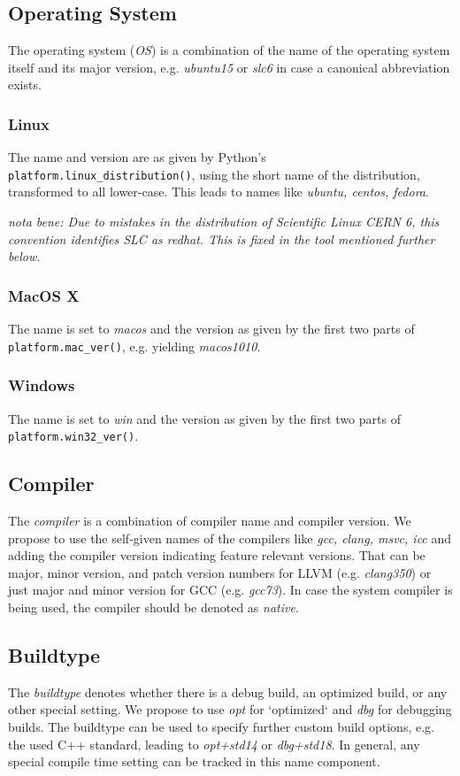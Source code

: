 \documentclass[12pt,a4paper]{article}
\begin{document}
\subsection{Operating System}
The operating system (\emph{OS}) is a combination of the name of the operating system itself and its major version, e.g. \emph{ubuntu15} or \emph{slc6} in case a canonical abbreviation exists.


\subsubsection{Linux}
The name and version are as given by Python's \texttt{platform.linux\_distribution()}, using the short name of the distribution, transformed to all lower-case. This leads to names like \emph{ubuntu, centos, fedora}.

\emph{nota bene: Due to mistakes in the distribution of Scientific Linux CERN 6, this convention identifies SLC as redhat. This is fixed in the tool mentioned further below.}

\subsubsection{MacOS X}
The name is set to \emph{macos} and the version as given by the first two parts of \texttt{platform.mac\_ver()}, e.g. yielding \emph{macos1010}.

\subsubsection{Windows}
The name is set to \emph{win} and the version as given by the first two parts of \texttt{platform.win32\_ver()}.


\subsection{Compiler}
The \emph{compiler} is a combination of compiler name and compiler version. We propose to use the self-given names of the compilers like \emph{gcc, clang, msvc, icc} and adding the compiler version indicating feature relevant versions. That can be major, minor version, and patch version numbers for LLVM (e.g. \emph{clang350}) or just major and minor version for GCC (e.g. \emph{gcc73}). In case the system compiler is being used, the compiler should be denoted as \emph{native}.


\subsection{Buildtype}
The \emph{buildtype} denotes whether there is a debug build, an optimized build, or any other special setting. We propose to use \emph{opt} for `optimized` and \emph{dbg} for debugging builds. The buildtype can be used to specify further custom build options, e.g. the used C++ standard, leading to \emph{opt+std14} or \emph{dbg+std18}.
In general, any special compile time setting can be tracked in this name component.
\end{document}

